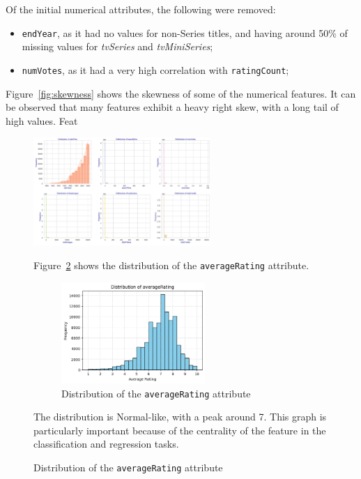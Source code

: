Of the initial numerical attributes, the following were removed:
\begin{itemize}
    \item \texttt{endYear}, as it had no values for non-Series titles, and having around 50\% of missing values for \textit{tvSeries} and
\textit{tvMiniSeries};
    \item \texttt{numVotes}, as it had a very high correlation with \texttt{ratingCount};
\end{itemize}

Figure~\ref{fig:skewness} shows the skewness of some of the numerical features.
It can be observed that many features exhibit a heavy right skew, with a long tail of high values.
Feat
\begin{figure}[H]
    \centering
    \includegraphics[width=0.6\textwidth]{plotsss/distribution-2.png}
    \caption{Skewness of some numerical features}
    \label{fig:skewness}

Figure~\ref{fig:rating_dist} shows the distribution of the
\texttt{averageRating} attribute.
\begin{figure}[H]
    \centering
    \includegraphics[width=0.6\textwidth]{plotsss/rating_distrib.png}
    \caption{Distribution of the \texttt{averageRating} attribute}
    \label{fig:rating_dist}
\end{figure}
The distribution is Normal-like, with a peak around 7.
This graph is particularly important because of the centrality
of the feature in the classification and regression tasks.




\end{figure}
